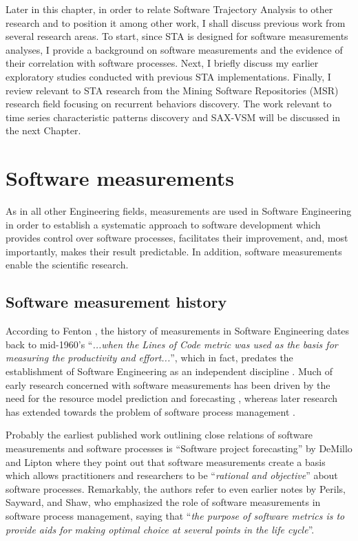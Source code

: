 Later in this chapter, in order to relate Software Trajectory Analysis to other research and to position 
it among other work, I shall discuss previous work from several research areas.
To start, since STA is designed for software measurements analyses, I provide a background on software 
measurements and the evidence of their correlation with software processes. 
Next, I briefly discuss my earlier exploratory studies conducted with previous STA implementations. 
Finally, I review relevant to STA research from the Mining Software Repositories (MSR) research field 
focusing on recurrent behaviors discovery.
The work relevant to time series characteristic patterns discovery and SAX-VSM will be discussed 
in the next Chapter.

\section{Software measurements}
As in all other Engineering fields, measurements are used in Software Engineering in order to establish a 
systematic approach to software development which provides control over software processes, facilitates
their improvement, and, most importantly, makes their result predictable. 
In addition, software measurements enable the scientific research.

\subsection{Software measurement history}
According to Fenton \cite{citeulike:1525462}, the history of measurements in Software Engineering dates 
back to mid-1960's  ``\textit{...when the Lines of Code metric was used as the basis for measuring the 
productivity and effort...}'', which in fact, predates the establishment of Software Engineering as an 
independent discipline \cite{naur_crisis_68}. 
Much of early research concerned with software measurements has been driven by the need for the resource model 
prediction and forecasting \cite{citeulike:1525462}, whereas later research has extended towards the problem 
of software process management \cite{citeulike:13158802}.

Probably the earliest published work outlining close relations of software measurements and software 
processes is ``Software project forecasting'' by DeMillo and Lipton \cite{demillo1980software} where they 
point out that software measurements create a basis which allows practitioners and researchers to be 
``\textit{rational and objective}'' about software processes. 
Remarkably, the authors refer to even earlier notes by Perils, Sayward, and Shaw, who emphasized the role of software 
measurements in software process management, saying that ``\textit{the purpose of software metrics is 
to provide aids for making optimal choice at several points in the life cycle}''.

